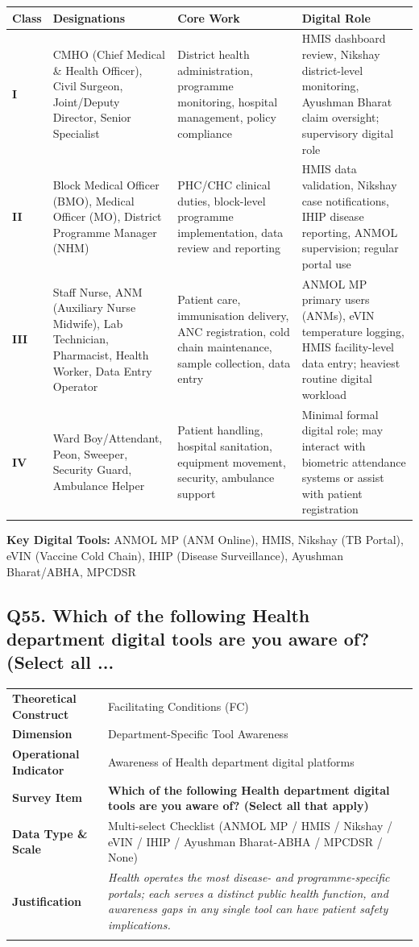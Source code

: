 \documentclass[11pt,a4paper]{article}
\makeatletter
\newcommand{\qcard}[8]{%
\noindent\begin{tabularx}{\textwidth}{@{}>{\columncolor{#7}\bfseries\small}L{3.2cm}|X@{}}
\arrayrulecolor{#8}\hline
Theoretical Construct & #1 \\
Dimension & #2 \\
Operational Indicator & #3 \\
\arrayrulecolor{gold}\hline
\rowcolor{white}\textbf{\color{#8}Survey Item} & \textbf{\color{#8}#4} \\
\arrayrulecolor{gold}\hline
Data Type \& Scale & #5 \\
Justification & \textit{#6} \\
\arrayrulecolor{#8}\hline
\end{tabularx}\vspace{10pt}
}
\makeatother
\begin{document}
\begin{table}[H]\centering\small
\begin{tabularx}{\textwidth}{L{1.2cm} L{3.5cm} L{4.5cm} X}
\toprule
\textbf{Class} & \textbf{Designations} & \textbf{Core Work} & \textbf{Digital Role} \\
\midrule
\textbf{I} & CMHO (Chief Medical \& Health Officer), Civil Surgeon, Joint/Deputy Director, Senior Specialist & District health administration, programme monitoring, hospital management, policy compliance & HMIS dashboard review, Nikshay district-level monitoring, Ayushman Bharat claim oversight; supervisory digital role \\[4pt]
\textbf{II} & Block Medical Officer (BMO), Medical Officer (MO), District Programme Manager (NHM) & PHC/CHC clinical duties, block-level programme implementation, data review and reporting & HMIS data validation, Nikshay case notifications, IHIP disease reporting, ANMOL supervision; regular portal use \\[4pt]
\textbf{III} & Staff Nurse, ANM (Auxiliary Nurse Midwife), Lab Technician, Pharmacist, Health Worker, Data Entry Operator & Patient care, immunisation delivery, ANC registration, cold chain maintenance, sample collection, data entry & ANMOL MP primary users (ANMs), eVIN temperature logging, HMIS facility-level data entry; heaviest routine digital workload \\[4pt]
\textbf{IV} & Ward Boy/Attendant, Peon, Sweeper, Security Guard, Ambulance Helper & Patient handling, hospital sanitation, equipment movement, security, ambulance support & Minimal formal digital role; may interact with biometric attendance systems or assist with patient registration \\
\bottomrule
\end{tabularx}
\end{table}

\textbf{Key Digital Tools:} ANMOL MP (ANM Online), HMIS, Nikshay (TB Portal), eVIN (Vaccine Cold Chain), IHIP (Disease Surveillance), Ayushman Bharat/ABHA, MPCDSR

\subsection*{Q55. Which of the following Health department digital tools are you aware of? (Select all ...}
\qcard{Facilitating Conditions (FC)}{Department-Specific Tool Awareness}{Awareness of Health department digital platforms}{Which of the following Health department digital tools are you aware of? (Select all that apply)}{Multi-select Checklist (ANMOL MP / HMIS / Nikshay / eVIN / IHIP / Ayushman Bharat-ABHA / MPCDSR / None)}{Health operates the most disease- and programme-specific portals; each serves a distinct public health function, and awareness gaps in any single tool can have patient safety implications.}{hlbg}{hlcol}
\end{document}
